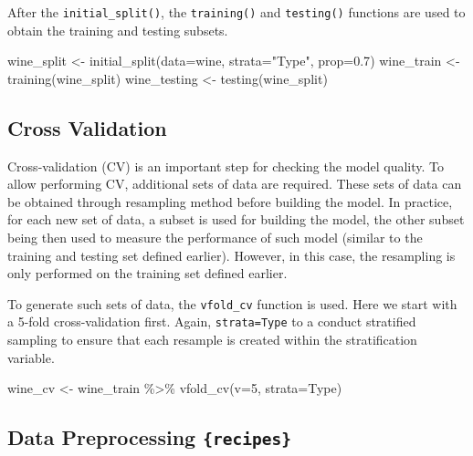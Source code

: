 \documentclass[
]{krantz}
\makeatletter
\newenvironment{Shaded}{\begin{snugshade}}{\end{snugshade}}
\newcommand{\AttributeTok}[1]{\textcolor[rgb]{0.61,0.61,0.61}{#1}}
\newcommand{\DecValTok}[1]{\textcolor[rgb]{0.06,0.06,0.06}{#1}}
\newcommand{\FloatTok}[1]{\textcolor[rgb]{0.06,0.06,0.06}{#1}}
\newcommand{\FunctionTok}[1]{\textcolor[rgb]{0,0,0}{#1}}
\newcommand{\NormalTok}[1]{#1}
\newcommand{\OtherTok}[1]{\textcolor[rgb]{0.37,0.37,0.37}{#1}}
\newcommand{\SpecialCharTok}[1]{\textcolor[rgb]{0,0,0}{#1}}
\newcommand{\StringTok}[1]{\textcolor[rgb]{0.5,0.5,0.5}{#1}}
\newenvironment{kframe}{%
\medskip{}
\setlength{\fboxsep}{.8em}
 \def\at@end@of@kframe{}%
 \ifinner\ifhmode%
  \def\at@end@of@kframe{\end{minipage}}%
  \begin{minipage}{\columnwidth}%
 \fi\fi%
 \def\FrameCommand##1{\hskip\@totalleftmargin \hskip-\fboxsep
 \colorbox{shadecolor}{##1}\hskip-\fboxsep
     \hskip-\linewidth \hskip-\@totalleftmargin \hskip\columnwidth}%
 \MakeFramed {\advance\hsize-\width
   \@totalleftmargin\z@ \linewidth\hsize
   \@setminipage}}%
 {\par\unskip\endMakeFramed%
 \at@end@of@kframe}
\renewenvironment{Shaded}{\begin{kframe}}{\end{kframe}}
\makeatother
\begin{document}
After the \texttt{initial\_split()}, the \texttt{training()} and \texttt{testing()} functions are used to obtain the training and testing subsets.

\begin{Shaded}
\begin{Highlighting}[]
\NormalTok{wine\_split }\OtherTok{\textless{}{-}} \FunctionTok{initial\_split}\NormalTok{(}\AttributeTok{data=}\NormalTok{wine, }\AttributeTok{strata=}\StringTok{"Type"}\NormalTok{, }\AttributeTok{prop=}\FloatTok{0.7}\NormalTok{)}
\NormalTok{wine\_train }\OtherTok{\textless{}{-}} \FunctionTok{training}\NormalTok{(wine\_split)}
\NormalTok{wine\_testing }\OtherTok{\textless{}{-}} \FunctionTok{testing}\NormalTok{(wine\_split)}
\end{Highlighting}
\end{Shaded}

\hypertarget{cross-validation}{%
\subsection{Cross Validation}\label{cross-validation}}

Cross-validation (CV) is an important step for checking the model quality. To allow performing CV, additional sets of data are required. These sets of data can be obtained through resampling method before building the model. In practice, for each new set of data, a subset is used for building the model, the other subset being then used to measure the performance of such model (similar to the training and testing set defined earlier). However, in this case, the resampling is only performed on the training set defined earlier.

To generate such sets of data, the \texttt{vfold\_cv} function is used. Here we start with a 5-fold cross-validation first. Again, \texttt{strata=Type} to a conduct stratified sampling to ensure that each resample is created within the stratification variable.

\begin{Shaded}
\begin{Highlighting}[]
\NormalTok{wine\_cv }\OtherTok{\textless{}{-}}\NormalTok{ wine\_train }\SpecialCharTok{\%\textgreater{}\%} 
  \FunctionTok{vfold\_cv}\NormalTok{(}\AttributeTok{v=}\DecValTok{5}\NormalTok{, }\AttributeTok{strata=}\NormalTok{Type)}
\end{Highlighting}
\end{Shaded}

\hypertarget{data-preprocessing-recipes}{%
\subsection{\texorpdfstring{Data Preprocessing \texttt{\{recipes\}}}{Data Preprocessing \{recipes\}}}\label{data-preprocessing-recipes}}
\end{document}
